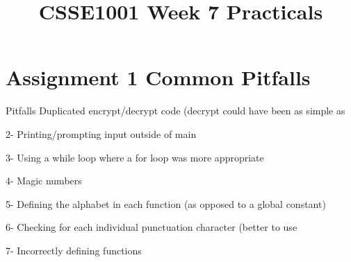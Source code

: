 \documentclass[week2]{csse1001}
\title{CSSE1001 Week 7 Practicals}
\begin{document}
\begin{frame} 
\maketitle
\end{frame}

\section{Assignment 1 Common Pitfalls}

\begin{topic}{Pitfalls}
Duplicated encrypt/decrypt code (decrypt could have been as simple as\\ 

\begin{subtopic}{2-}
Printing/prompting input outside of main
\end{subtopic}

\begin{subtopic}{3-}
Using a while loop where a for loop was more appropriate
\end{subtopic}

\begin{subtopic}{4-}
Magic numbers
\end{subtopic}

\begin{subtopic}{5-}
Defining the alphabet in each function (as opposed to a global constant)
\end{subtopic}

\begin{subtopic}{6-}
Checking for each individual punctuation character (better to use\\ 
\end{subtopic}

\begin{subtopic}{7-}
Incorrectly defining functions
\end{subtopic}

\end{topic}
\end{document}
